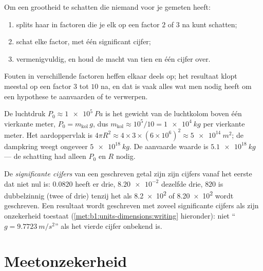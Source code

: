 \begin{method}[Schatten]\label{met:b1:units-dimensions:estimate}
Om een grootheid te schatten die niemand voor je gemeten heeft:
\begin{enumerate}
  \item splits haar in factoren die je elk op een factor $2$ of $3$ na kunt
        schatten;
  \item schat elke factor, met één significant cijfer;
  \item vermenigvuldig, en houd de macht van tien en één cijfer over.
\end{enumerate}
Fouten in verschillende factoren heffen elkaar deels op; het resultaat klopt
meestal op een factor $3$ tot $10$ na, en dat is vaak alles wat men nodig
heeft om een hypothese te aanvaarden of te verwerpen.
\end{method}

\begin{example}\label{ex:b1:units-dimensions:atmosphere}
De luchtdruk $P_0 \approx \qty{1e5}{Pa}$ is het gewicht van de luchtkolom
boven één vierkante meter, $P_0 = m_{\text{kol}}\,g$, dus
$m_{\text{kol}} \approx 10^5/10 = \qty{1e4}{kg}$ per vierkante meter. Het
aardoppervlak is $4\pi R^2 \approx 4 \times 3 \times (6\times10^6)^2
\approx \qty{5e14}{m^2}$; de dampkring weegt ongeveer
$\qty{5e18}{kg}$. De aanvaarde waarde is $\qty{5.1e18}{kg}$ --- de
schatting had alleen $P_0$ en $R$ nodig.
\end{example}

\begin{definition}\label{def:b1:units-dimensions:sigfig}
De \emph{significante cijfers} van een geschreven getal zijn zijn cijfers
vanaf het eerste dat niet nul is: $0.0820$ heeft er drie, $\num{8.20e-2}$
dezelfde drie, $820$ is dubbelzinnig (twee of drie) tenzij het als \num{8.2e2}
of \num{8.20e2} wordt geschreven. Een resultaat wordt geschreven met zoveel
significante cijfers als zijn onzekerheid toestaat
(\cref{met:b1:units-dimensions:writing} hieronder): niet
``$g = \qty{9.7723}{m/s^2}$'' als het vierde cijfer onbekend is.
\end{definition}

\section{Meetonzekerheid}

